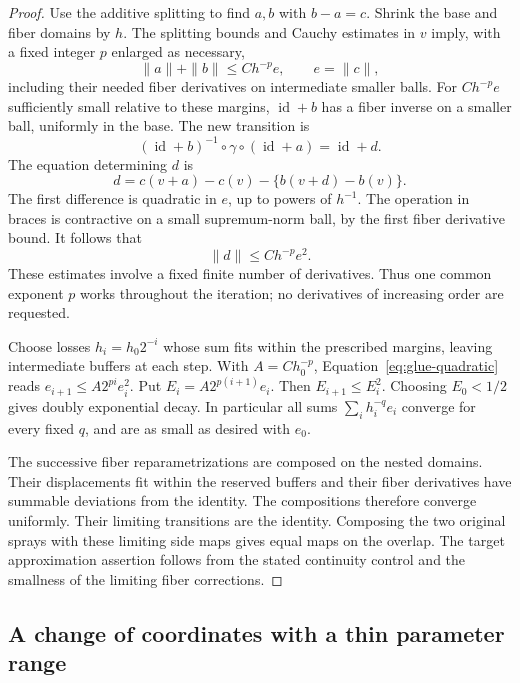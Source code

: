 \begin{proof}
Use the additive splitting to find $a,b$ with $b-a=c$. Shrink the
base and fiber domains by $h$. The splitting bounds and Cauchy
estimates in $v$ imply, with a fixed integer $p$ enlarged as necessary,
\[
 \|a\|+\|b\|\le Ch^{-p}e,\qquad e=\|c\|,
\]
including their needed fiber derivatives on intermediate smaller balls.
For $Ch^{-p}e$ sufficiently small relative to these margins,
$\operatorname{id}+b$ has a fiber inverse on a smaller ball, uniformly
in the base. The new transition is
\[
 (\operatorname{id}+b)^{-1}\circ\gamma\circ(\operatorname{id}+a)
       =\operatorname{id}+d.
\]
The equation determining $d$ is
\[
 d= c(v+a)-c(v)-\{b(v+d)-b(v)\}.
\]
The first difference is quadratic in $e$, up to powers of $h^{-1}$.
The operation in braces is contractive on a small supremum-norm ball,
by the first fiber derivative bound. It follows that
\begin{equation}\label{eq:glue-quadratic}
             \|d\|\le Ch^{-p}e^2.
\end{equation}
These estimates involve a fixed finite number of derivatives. Thus one
common exponent $p$ works throughout the iteration; no derivatives of
increasing order are requested.

Choose losses $h_i=h_0 2^{-i}$ whose sum fits within the prescribed
margins, leaving intermediate buffers at each step. With
$A=Ch_0^{-p}$, Equation~\eqref{eq:glue-quadratic} reads
$e_{i+1}\le A2^{pi}e_i^2$. Put $E_i=A2^{p(i+1)}e_i$. Then
$E_{i+1}\le E_i^2$. Choosing $E_0<1/2$ gives doubly exponential decay.
In particular all sums $\sum_i h_i^{-q}e_i$ converge for every fixed
$q$, and are as small as desired with $e_0$.

The successive fiber reparametrizations are composed on the nested
domains. Their displacements fit within the reserved buffers and their
fiber derivatives have summable deviations from the identity. The
compositions therefore converge uniformly. Their limiting transitions
are the identity.
Composing the two original sprays with these limiting side maps gives
equal maps on the overlap.
The target approximation assertion follows from the stated continuity
control and the smallness of the limiting fiber corrections.
\end{proof}

\subsection{A change of coordinates with a thin parameter range}

